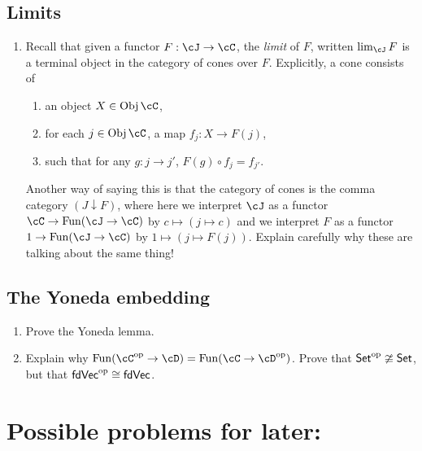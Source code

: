 \documentclass[12pt]{amsart}
\begin{document}
\subsection{Limits}
\begin{enumerate}
\item
Recall that given a functor $F : \cJ \to \cC$, the \emph{limit} of $F$, written $\lim_\cJ F$ is a terminal object in the category of cones over $F$. Explicitly, a cone consists of
\begin{enumerate}
	\item an object $X \in \Obj\cC$,
	\item for each $j \in \Obj\cC$, a map $f_j : X \to F(j)$,
	\item such that for any $g:j \to j'$, $F(g) \circ f_j = f_{j'}$.
\end{enumerate}
Another way of saying this is that the category of cones is the comma category $(J \downarrow F)$, where here we interpret $\cJ$ as a functor $\cC \to \Fun(\cJ \to \cC)$ by $c \mapsto (j \mapsto c)$ and we interpret $F$ as a functor $1 \to \Fun(\cJ \to \cC)$ by $1 \mapsto (j \mapsto F(j))$. Explain carefully why these are talking about the same thing!
\end{enumerate}


\subsection{The Yoneda embedding}
\begin{enumerate}
\item Prove the Yoneda lemma.
\item Explain why $\Fun(\cC^\text{op} \to \cD) = \Fun(\cC \to \cD^\text{op})$. Prove that $\mathsf{Set}^\text{op} \ncong \mathsf{Set}$, but that $\mathsf{fdVec}^\text{op} \cong \mathsf{fdVec}$.
\end{enumerate}

\newpage
\section{Possible problems for later:}
\end{document}
